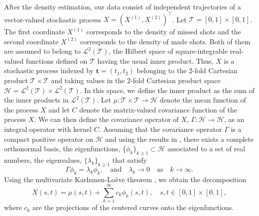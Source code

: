 After the density estimation, our data consist of independent trajectories of a vector-valued stochastic process $X = (X^{(1)}, X^{(2)})^{\top}$. Let $\mathcal{T} = [0, 1] \times [0, 1]$. The first coordinate $X^{(1)}$ corresponds to the density of missed shots and the second coordinate $X^{(2)}$ corresponds to the density of made shots. Both of them are assumed to belong to $\mathcal{L}^2(\mathcal{T})$, the Hilbert space of square-integrable real-valued functions defined on $\mathcal{T}$ having the usual inner product. Thus, $X$ is a stochastic process indexed by $\mathbf{t} = (t_1, t_2)$ belonging to the $2$-fold Cartesian product $\mathcal{T} \times \mathcal{T}$ and taking values in the $2$-fold Cartesian product space $\mathcal{H} = \mathcal{L}^2(\mathcal{T}) \times \mathcal{L}^2(\mathcal{T})$. In this space, we define the inner product as the sum of the inner products in $\mathcal{L}^2(\mathcal{T})$. Let $\mu: \mathcal{T} \times \mathcal{T} \rightarrow \mathcal{H}$ denote the mean function of the process $X$ and let $C$ denote the matrix-valued covariance function of the process $X$. We can then define the covariance operator of $X$, $\Gamma: \mathcal{H} \rightarrow \mathcal{H}$, as an integral operator with kernel $C$.
Assuming that the covariance operator $\Gamma$ is a compact positive operator on $\mathcal{H}$ and using the results in \cite{happMultivariateFunctionalPrincipal2018}, there exists a complete orthonormal basis, the eigenfunctions, $\{\phi_k\}_{k \geq 1} \subset \mathcal{H}$ associated to a set of real numbers, the eigenvalues, $\{\lambda_k\}_{k \geq 1}$ that satisfy
$$\Gamma \phi_k = \lambda_k \phi_k, \quad\text{and}\quad \lambda_k \rightarrow 0 \quad\text{as}\quad k \rightarrow \infty.$$
Using the multivariate Karhunen-Loève theorem \citep{happMultivariateFunctionalPrincipal2018}, we obtain the decomposition
\begin{equation}\label{eq:kl_decomp_inf}
	X(s, t) = \mu(s, t) + \sum_{k = 1}^{\infty} c_k\phi_k(s, t), \quad s, t \in [0, 1] \times [0, 1],
\end{equation}
where $c_k$ are the projections of the centered curves onto the eigenfunctions.


